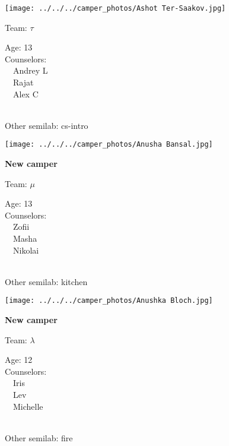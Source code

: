 \documentclass[10pt,letterpaper, landscape]{article}
\begin{document}
\horizontalshiftfornextsticker
\renewcommand{\baselinestretch}{1} \begin{sticker}
\noindent\begin{minipage}{0.5\textwidth}\texttt{[image: ../../../camper\_photos/Ashot Ter-Saakov.jpg]}\end{minipage}\begin{minipage}{0.45\textwidth}
Team: {\Large $\tau$}

Age:        13\\
Counselors: \\\ \ Andrey L\\\ \ Rajat\\\ \ Alex C\\
\end{minipage} \\ \vspace{0.07in}
Other semilab: cs-intro
\end{sticker}
\horizontalshiftfornextsticker
\renewcommand{\baselinestretch}{1} \begin{sticker}
\noindent\begin{minipage}{0.5\textwidth}\texttt{[image: ../../../camper\_photos/Anusha Bansal.jpg]}\end{minipage}\begin{minipage}{0.45\textwidth}
\textbf{New camper} 

Team: {\Large $\mu$}

Age:        13\\
Counselors: \\\ \ Zofii\\\ \ Masha\\\ \ Nikolai\\
\end{minipage} \\ \vspace{0.07in}
Other semilab: kitchen
\end{sticker}
\horizontalshiftfornextsticker
\renewcommand{\baselinestretch}{1} \begin{sticker}
\noindent\begin{minipage}{0.5\textwidth}\texttt{[image: ../../../camper\_photos/Anushka Bloch.jpg]}\end{minipage}\begin{minipage}{0.45\textwidth}
\textbf{New camper} 

Team: {\Large $\lambda$}

Age:        12\\
Counselors: \\\ \ Iris\\\ \ Lev\\\ \ Michelle\\
\end{minipage} \\ \vspace{0.07in}
Other semilab: fire
\end{sticker}
\end{document}

